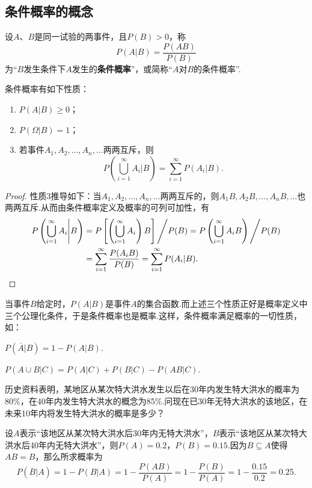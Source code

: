 \subsection{条件概率的概念}
\begin{definition}
设\(A\)、\(B\)是同一试验的两事件，且\(P(B) > 0\)，称\[
P(A \vert B) = \frac{P(AB)}{P(B)}
\]为“\(B\)发生条件下\(A\)发生的\textbf{条件概率}”，或简称“\(A\)对\(B\)的条件概率”.
\end{definition}

\begin{property}
条件概率有如下性质：\begin{enumerate}
\item \(P(A \vert B) \geqslant 0\)；
\item \(P(\Omega \vert B) = 1\)；
\item 若事件\(A_1,A_2,\dotsc,A_n,\dotsc\)两两互斥，则\[
P\left(\bigcup_{i=1}^{\infty}{A_i} \Bigg\vert B\right)
= \sum\limits_{i=1}^{\infty}{P(A_i \vert B)}.
\]
\end{enumerate}
\begin{proof}
性质3推导如下：当\(A_1,A_2,\dotsc,A_n,\dotsc\)两两互斥的，则\(A_1 B,A_2 B,\dotsc,A_n B,\dotsc\)也两两互斥.从而由条件概率定义及概率的可列可加性，有\begin{align*}
P\left(\bigcup_{i=1}^{\infty}{A_i} \Bigg\vert B\right)
&= P\left[\left(\displaystyle\bigcup_{i=1}^{\infty}{A_i}\right) B\right] \Bigg/ P(B)
= P\left(\displaystyle\bigcup_{i=1}^{\infty}{A_i B}\right) \Bigg/ P(B) \\
&= \sum\limits_{i=1}^{\infty}{\frac{P(A_i B)}{P(B)}}
= \sum\limits_{i=1}^{\infty}{P(A_i \vert B)}.
\qedhere
\end{align*}
\end{proof}
\end{property}

当事件\(B\)给定时，\(P(A \vert B)\)是事件\(A\)的集合函数.而上述三个性质正好是概率定义中三个公理化条件，于是条件概率也是概率.这样，条件概率满足概率的一切性质，如：

\begin{property}
\(P(\overline{A} \vert B) = 1 - P(A \vert B)\).
\end{property}

\begin{property}
\(P(A \cup B \vert C) = P(A \vert C) + P(B \vert C) - P(AB \vert C)\).
\end{property}

\begin{example}
历史资料表明，某地区从某次特大洪水发生以后在30年内发生特大洪水的概率为80\%，在40年内发生特大洪水的概念为85\%.问现在已30年无特大洪水的该地区，在未来10年内将发生特大洪水的概率是多少？
\begin{solution}
设\(A\)表示“该地区从某次特大洪水后30年内无特大洪水”，\(B\)表示“该地区从某次特大洪水后40年内无特大洪水”，则\(P(A) = 0.2\)，\(P(B) = 0.15\).因为\(B \subseteq A\)使得\(AB = B\)，那么所求概率为\[
P(\overline{B} \vert A)
= 1 - P(B \vert A)
= 1 - \frac{P(AB)}{P(A)}
= 1 - \frac{P(B)}{P(A)}
= 1 - \frac{0.15}{0.2}
= 0.25.
\]
\end{solution}
\end{example}

